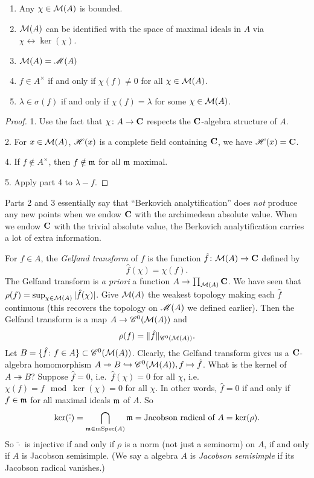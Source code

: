 \begin{lemma}
\leavevmode
\begin{enumerate}
\item
Any $\chi\in \mathcal{M}(A)$ is bounded.

\item
$\mathcal{M}(A)$ can be identified with the space of maximal ideals in $A$ via 
$\chi\leftrightarrow \ker(\chi)$. 

\item
$\mathcal{M}(A)=\operatorname{\mathscr{M}}(A)$

\item
$f\in A^\times$ if and only if $\chi(f)\ne 0$ for all $\chi\in \mathcal{M}(A)$. 

\item
$\lambda\in \sigma(f)$ if and only if $\chi(f)=\lambda$ for some 
$\chi\in \mathcal{M}(A)$. 
\end{enumerate}
\end{lemma}
\begin{proof}
1. Use the fact that $\chi\colon A\to \mathbf{C}$ respects the $\mathbf{C}$-algebra structure 
of $A$. 

2. For $x\in \mathcal{M}(A)$, $\mathscr{H}(x)$ is a complete field containing $\mathbf{C}$, we have 
$\mathscr{H}(x)=\mathbf{C}$. 

4. If $f\notin A^\times$, then $f\notin \mathfrak{m}$ for all $\mathfrak{m}$ maximal. 

5. Apply part 4 to $\lambda-f$. 
\end{proof}

Parts 2 and 3 essentially say that ``Berkovich analytification'' does 
\emph{not} produce any new points when we endow $\mathbf{C}$ with the archimedean 
absolute value. When we endow $\mathbf{C}$ with the trivial absolute value, the 
Berkovich analytification carries a lot of extra information. 

For $f\in A$, the \emph{Gelfand transform} of $f$ is the function 
$\hat f\colon \mathcal{M}(A)\to \mathbf{C}$ defined by 
\[
  \hat f(\chi) = \chi(f) .
\]
The Gelfand transform is \emph{a priori} a function $A\to \prod_{\mathcal{M}(A)}\mathbf{C}$. 
We have seen that $\rho(f) = \sup_{\chi\in \mathcal{M}(A)} |\hat f(\chi)|$. Give 
$\mathcal{M}(A)$ the weakest topology making each $\hat f$ continuous (this recovers 
the topology on $\operatorname{\mathscr{M}}(A)$ we defined earlier). Then the Gelfand 
transform is a map $A\to \mathscr{C}^0(\mathcal{M}(A))$ and 
\[
  \rho(f) = \|\hat f\|_{\mathscr{C}^0(\mathcal{M}(A))} .
\]
Let $B=\{\hat f\colon f\in A\}\subset \mathscr{C}^0(\mathcal{M}(A))$. Clearly, the Gelfand 
transform gives us a $\mathbf{C}$-algebra homomorphism 
$A\twoheadrightarrow B\hookrightarrow \mathscr{C}^0(\mathcal{M}(A)),f\mapsto \hat f$. What is 
the kernel of $A\twoheadrightarrow B$? Suppose $\hat f=0$, 
i.e.~$\hat f(\chi)=0$ for all $\chi$, i.e.~$\chi(f)=f\mod\ker(\chi)=0$ for all 
$\chi$. In other words, $\hat f=0$ if and only if $f\in \mathfrak{m}$ for all maximal 
ideals $\mathfrak{m}$ of $A$. So 
\[
  \ker(\hat\cdot) = \bigcap_{\mathfrak{m}\in \mathrm{mSpec}(A)} \mathfrak{m} = \text{Jacobson radical of } A  = \ker(\rho).
\]
So $\hat\cdot$ is injective if and only if $\rho$ is a norm (not just a 
seminorm) on $A$, if and only if $A$ is Jacobson semisimple. (We say a algebra 
$A$ is \emph{Jacobson semisimple} if its Jacobson radical vanishes.)

